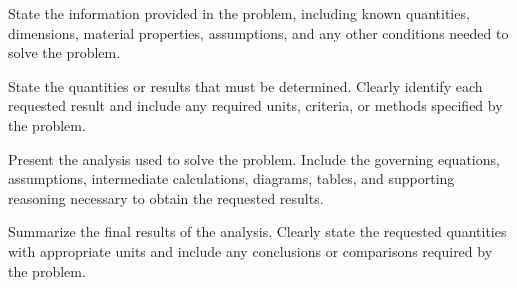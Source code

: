 \begin{problem}

\begin{given}
State the information provided in the problem, including known quantities, dimensions, material properties, assumptions, and any other conditions needed to solve the problem.
\end{given}

\begin{find}
State the quantities or results that must be determined. Clearly identify each requested result and include any required units, criteria, or methods specified by the problem.
\end{find}

\begin{solution}
Present the analysis used to solve the problem. Include the governing equations, assumptions, intermediate calculations, diagrams, tables, and supporting reasoning necessary to obtain the requested results.
\end{solution}

\begin{answer}
Summarize the final results of the analysis. Clearly state the requested quantities with appropriate units and include any conclusions or comparisons required by the problem.
\end{answer}

\end{problem}
